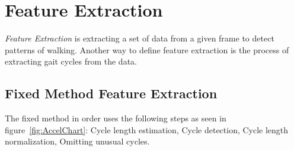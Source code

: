 \documentclass{sig-alternate}
\begin{document}
\section{Feature Extraction}
	\textit{Feature Extraction} is extracting a set of data from a given frame to detect patterns of walking. Another way to define feature extraction is the process of extracting gait cycles from the data. 
\subsection{Fixed Method Feature Extraction}
	The fixed method in order uses the following steps as seen in figure~\ref{fig:AccelChart}: Cycle length estimation, Cycle detection, Cycle length normalization, Omitting unusual cycles.
\end{document}
